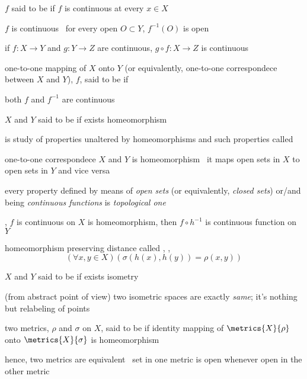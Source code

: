\documentclass[17pt,landscape]{foils}
\begin{document}
{{	\vitem $f$ said to be  if $f$ is continuous at every $x\in X$

	\vitem $f$ is continuous \iaoi\ for every open $O\subset Y$, $f^{-1}(O)$ is open

	\vitem if $f:X\to Y$ and $g:Y\to Z$ are continuous, $g\circ f:X\to Z$ is continuous
\eit



\bit
	\item one-to-one mapping of $X$ onto $Y$ (or equivalently, one-to-one correspondece between $X$ and $Y$), $f$,
		said to be  if
	\bit
		\item both $f$ and $f^{-1}$ are continuous
	\eit

	\vitem $X$ and $Y$ said to be  if exists homeomorphism

	\vitem {} is study of properties unaltered by homeomorphisms and
		such properties called 

	\vitem one-to-one correspondece $X$ and $Y$ is homeomorphism \iaoi\
		it maps open sets in $X$ to open sets in $Y$ and vice versa

	\vitem every property defined by means of \emph{open sets} (or equivalently, \emph{closed sets})
		or/and being \emph{continuous functions}
		is \emph{topological one}
	\bit
		\item \eg, $f$ is continuous on $X$ is homeomorphism, then $f\circ h^{-1}$ is continuous function on $Y$
	\eit
\eit



\bit
	\item homeomorphism preserving distance called , \ie,
	\[
		(\forall x,y \in X)(\sigma(h(x),h(y)) = \rho(x,y))
	\]

	\vitem $X$ and $Y$ said to be  if exists isometry

	\vitem (from abstract point of view)
		two isometric spaces are exactly \emph{same};
		it's nothing but relabeling of points

	\vitem two metrics, $\rho$ and $\sigma$ on $X$, said to be 
		if identity mapping of $\metrics{X}{\rho}$ onto $\metrics{X}{\sigma}$
		is homeomorphism
	\bit
		\item hence, two metrics are equivalent \iaoi\ set in one metric is open whenever open in the other metric
	\eit
\eit



}}
\end{document}
